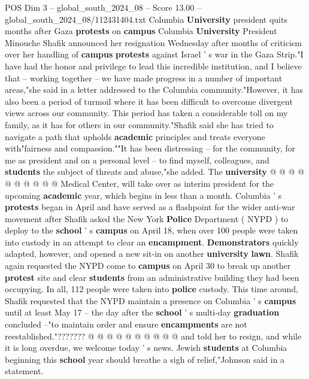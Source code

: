 \begin{textsample}{POS Dim 3 – global\_south\_2024\_08 – Score 13.00 – global\_south\_2024\_08/112431404.txt}  \label{ex:f3_pos_336}
Columbia \textbf{University} president quits months after Gaza \textbf{protests} on \textbf{campus} Columbia \textbf{University} President Minouche Shafik announced her resignation Wednesday after months of criticism over her handling of \textbf{campus} \textbf{protests} against Israel ' s war in the Gaza Strip."I have had the honor and privilege to lead this incredible institution, and I believe that -- working together -- we have made progress in a number of important areas,"she said in a letter addressed to the Columbia community."However, it has also been a period of turmoil where it has been difficult to overcome divergent views across our community.
This period has taken a considerable toll on my family, as it has for others in our community."Shafik said she has tried to navigate a path that upholds \textbf{academic} principles and treats everyone with"fairness and compassion.""It has been distressing -- for the community, for me as president and on a personal level -- to find myself, colleagues, and \textbf{students} the subject of threats and abuse,"she added.
The \textbf{university} @ @ @ @ @ @ @ @ @ @ Medical Center, will take over as interim president for the upcoming \textbf{academic} year, which begins in less than a month.
Columbia ' s \textbf{protests} began in April and have served as a flashpoint for the wider anti-war movement after Shafik asked the New York \textbf{Police} Department ( NYPD ) to deploy to the \textbf{school} ' s \textbf{campus} on April 18, when over 100 people were taken into custody in an attempt to clear an \textbf{encampment}. \textbf{Demonstrators} quickly adapted, however, and opened a new sit-in on another \textbf{university} \textbf{lawn}.
Shafik again requested the NYPD come to \textbf{campus} on April 30 to break up another \textbf{protest} site and clear \textbf{students} from an administrative building they had been occupying.
In all, 112 people were taken into \textbf{police} custody.
This time around, Shafik requested that the NYPD maintain a presence on Columbia ' s \textbf{campus} until at least May 17 -- the day after the \textbf{school} ' s multi-day \textbf{graduation} concluded --"to maintain order and ensure \textbf{encampments} are not reestablished."??????? @ @ @ @ @ @ @ @ @ @ and told her to resign, and while it is long overdue, we welcome today ' s news.
Jewish \textbf{students} at Columbia beginning this \textbf{school} year should breathe a sigh of relief,"Johnson said in a statement.

\end{textsample}
